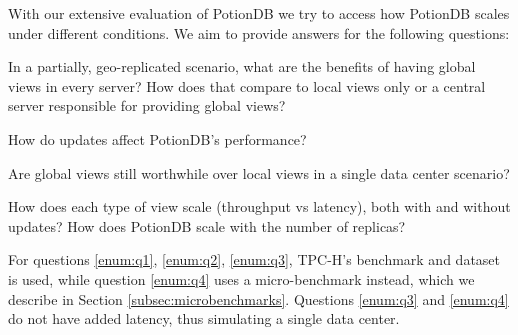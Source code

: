\documentclass[sigplan,review,anonymous]{acmart}
\begin{document}
With our extensive evaluation of PotionDB we try to access how PotionDB scales under different conditions.
We aim to provide answers for the following questions:
\begin{enumerate*}[label=(\roman*)]
	\item  \label{enum:q1} In a partially, geo-replicated scenario, what are the benefits of having global views in every server?
	How does that compare to local views only or a central server responsible for providing global views?
	\item \label{enum:q2} How do updates affect PotionDB's performance?
	\item \label{enum:q3} Are global views still worthwhile over local views in a single data center scenario?
	\item \label{enum:q4} How does each type of view scale (throughput vs latency), both with and without updates? How does PotionDB scale with the number of replicas?
\end{enumerate*}


For questions \ref{enum:q1}, \ref{enum:q2}, \ref{enum:q3}, TPC-H's benchmark and dataset is used, while question \ref{enum:q4} uses a micro-benchmark instead, which we describe in Section \ref{subsec:microbenchmarks}.
Questions \ref{enum:q3} and \ref{enum:q4} do not have added latency, thus simulating a single data center.
\end{document}
